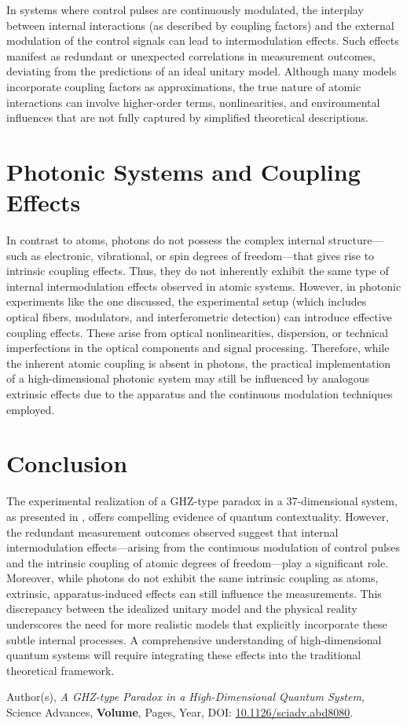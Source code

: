 \documentclass[12pt]{article}
\begin{document}
	In systems where control pulses are continuously modulated, the interplay between internal interactions (as described by coupling factors) and the external modulation of the control signals can lead to intermodulation effects. Such effects manifest as redundant or unexpected correlations in measurement outcomes, deviating from the predictions of an ideal unitary model. Although many models incorporate coupling factors as approximations, the true nature of atomic interactions can involve higher-order terms, nonlinearities, and environmental influences that are not fully captured by simplified theoretical descriptions.
	
	\section{Photonic Systems and Coupling Effects}
	In contrast to atoms, photons do not possess the complex internal structure—such as electronic, vibrational, or spin degrees of freedom—that gives rise to intrinsic coupling effects. Thus, they do not inherently exhibit the same type of internal intermodulation effects observed in atomic systems. However, in photonic experiments like the one discussed, the experimental setup (which includes optical fibers, modulators, and interferometric detection) can introduce effective coupling effects. These arise from optical nonlinearities, dispersion, or technical imperfections in the optical components and signal processing. Therefore, while the inherent atomic coupling is absent in photons, the practical implementation of a high-dimensional photonic system may still be influenced by analogous extrinsic effects due to the apparatus and the continuous modulation techniques employed.
	
	\section{Conclusion}
	The experimental realization of a GHZ-type paradox in a 37-dimensional system, as presented in \cite{ScienceAdvances}, offers compelling evidence of quantum contextuality. However, the redundant measurement outcomes observed suggest that internal intermodulation effects—arising from the continuous modulation of control pulses and the intrinsic coupling of atomic degrees of freedom—play a significant role. Moreover, while photons do not exhibit the same intrinsic coupling as atoms, extrinsic, apparatus-induced effects can still influence the measurements. This discrepancy between the idealized unitary model and the physical reality underscores the need for more realistic models that explicitly incorporate these subtle internal processes. A comprehensive understanding of high-dimensional quantum systems will require integrating these effects into the traditional theoretical framework.
	
	\begin{thebibliography}{9}
		Author(s), \emph{A GHZ-type Paradox in a High-Dimensional Quantum System}, Science Advances, \textbf{Volume}, Pages, Year, DOI: \href{https://doi.org/10.1126/sciadv.abd8080}{10.1126/sciadv.abd8080}.
	\end{thebibliography}
	
\end{document}
